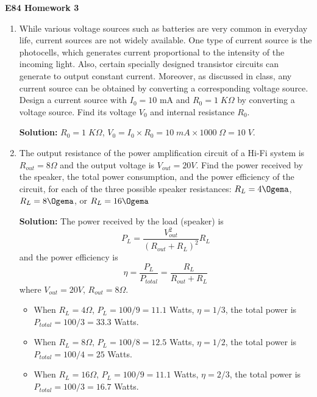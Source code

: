 \usepackage{html}

\begin{center}
{\Large \bf E84 Homework 3}
\end{center}
\begin{enumerate}

\item While various voltage sources such as batteries are very common 
in everyday life, current sources are not widely available. One type of
current source is the photocells, which generates current proportional 
to the intensity of the incoming light. Also, certain specially designed
transistor circuits can generate to output constant current. Moreover, 
as discussed in class, any current source can be obtained by converting
a corresponding voltage source. Design a current source with $I_0=10$ mA 
and $R_0=1\;K\Omega$ by converting a voltage source. Find its voltage 
$V_0$ and internal resistance $R_0$. 

 {\bf Solution:} $R_0=1\;K\Omega$, $V_0=I_0\times R_0=10\;mA \times 1000\;
 \Omega=10\;V$.




\item The output resistance of the power amplification circuit of
  a Hi-Fi system is $R_{out}=8\Omega$ and the output voltage is 
  $V_{out}=20V$. Find the power received by the speaker, the total
  power consumption, and the power efficiency of the circuit, for 
  each of the three possible speaker resistances: $R_L=4\Ogema$, 
  $R_L=8\Ogema$, or $R_L=16\Ogema$

 {\bf Solution:} The power received by the load (speaker) is 
 \[ P_L=\frac{V_{out}^2}{(R_{out}+R_L)^2} R_L \]
 and the power efficiency is
 \[ \eta=\frac{P_L}{P_{total}}=\frac{R_L}{R_{out}+R_L} \]
 where $V_{out}=20V$, $R_{out}=8\Omega$. 
 \begin{itemize}
 \item When $R_L=4\Omega$, $P_L=100/9=11.1$ Watts, $\eta=1/3$, 
   the total power is $P_{total}=100/3=33.3$ Watts.
 \item When $R_L=8\Omega$, $P_L=100/8=12.5$ Watts, $\eta=1/2$,
   the total power is $P_{total}=100/4=25$ Watts.
 \item When $R_L=16\Omega$, $P_L=100/9=11.1$ Watts, $\eta=2/3$,
   the total power is $P_{total}=100/3=16.7$ Watts.
 \end{itemize}


\end{enumerate}
